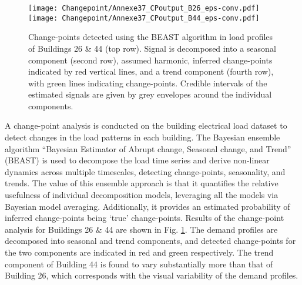 \begin{subappendices}
    \begin{figure}[t]
        \centering
        \hspace*{\fill}
        \texttt{[image: Changepoint/Annexe37\_CPoutput\_B26\_eps-conv.pdf]}
        \hspace*{\fill}
        \texttt{[image: Changepoint/Annexe37\_CPoutput\_B44\_eps-conv.pdf]}
        \hspace*{\fill}
        \bigskip
        \caption{Change-points detected using the BEAST algorithm in load profiles of Buildings 26 \& 44 (top row). Signal is decomposed into a seasonal component (second row), assumed harmonic, inferred change-points indicated by red vertical lines, and a trend component (fourth row), with green lines indicating change-points. Credible intervals of the estimated signals are given by grey envelopes around the individual components.}
        \label{fig:forecasting-change-points}
    \end{figure}

    A change-point analysis is conducted on the building electrical load dataset to detect changes in the load patterns in each building. The Bayesian ensemble algorithm ``Bayesian Estimator of Abrupt change, Seasonal change, and Trend'' (BEAST) \citep{zhao2019DetectingChangepointTrend} is used to decompose the load time series and derive non-linear dynamics across multiple timescales, detecting change-points, seasonality, and trends. The value of this ensemble approach is that it quantifies the relative usefulness of individual decomposition models, leveraging all the models via Bayesian model averaging. Additionally, it provides an estimated probability of inferred change-points being `true’ change-points. Results of the change-point analysis for Buildings 26 \& 44 are shown in Fig. \ref{fig:forecasting-change-points}. The demand profiles are decomposed into seasonal and trend components, and detected change-points for the two components are indicated in red and green respectively. The trend component of Building 44 is found to vary substantially more than that of Building 26, which corresponds with the visual variability of the demand profiles.
\end{subappendices}